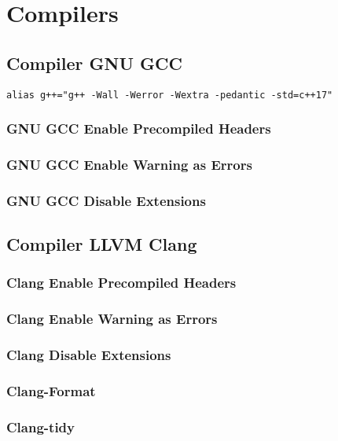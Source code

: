 \documentclass[openany]{report}
\begin{document}
\chapter{Compilers}

\section{Compiler GNU GCC}

\begin{verbatim}
alias g++="g++ -Wall -Werror -Wextra -pedantic -std=c++17"
\end{verbatim}

\subsection{GNU GCC Enable Precompiled Headers}
\subsection{GNU GCC Enable Warning as Errors}
\subsection{GNU GCC Disable Extensions}


\section{Compiler LLVM Clang}

\subsection{Clang Enable Precompiled Headers}
\subsection{Clang Enable Warning as Errors}
\subsection{Clang Disable Extensions}

\subsection{Clang-Format}

\subsection{Clang-tidy}
\end{document}
